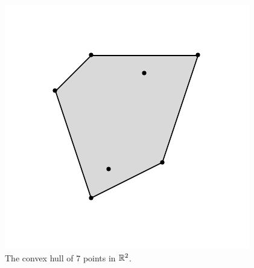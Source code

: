 \begin{frame}
  
\begin{figure}[htbp]
  \begin{center}
    \includegraphics{../figures/picture1.pdf}    
  \end{center}
  \caption{The convex hull of $7$ points in $\mathbb{R}^2$. }\label{conv:fig:2}
\end{figure}

\end{frame}


